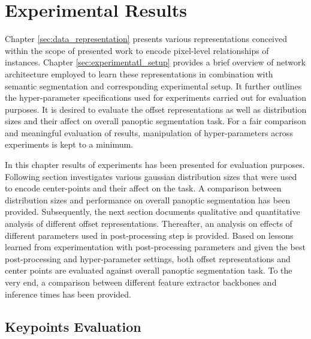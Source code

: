 
\chapter{Experimental Results}
\label{sec:evaluation}

Chapter \ref{sec:data_representation} presents various representations conceived within the scope of presented work to encode pixel-level relationships of instances. Chapter \ref{sec:experimentatl_setup} provides a brief overview of network architecture employed to learn these representations in combination with semantic segmentation and corresponding experimental setup. It further outlines the hyper-parameter specifications used for experiments carried out for evaluation purposes.  It is desired to evaluate the offset representations as well as distribution sizes and their affect on overall panoptic segmentation task. For a fair comparison and meaningful evaluation of results, manipulation of hyper-parameters across experiments is kept to a minimum. 

In this chapter results of experiments has been presented for evaluation purposes. Following section investigates various gaussian distribution sizes that were used to encode center-points and their affect on the task. A comparison between distribution sizes and performance on overall panoptic segmentation has been provided. Subsequently, the next section documents qualitative and quantitative analysis of different offset representations. Thereafter, an analysis on effects of different parameters used in post-processing step is provided. Based on lessons learned from experimentation with post-processing parameters and given the best post-processing and hyper-parameter settings, both offset representations and center points are evaluated against overall panoptic segmentation task. To the very end, a comparison between different feature extractor backbones and inference times has been provided.  


\bigskip



\section{Keypoints Evaluation}


\bigskip


